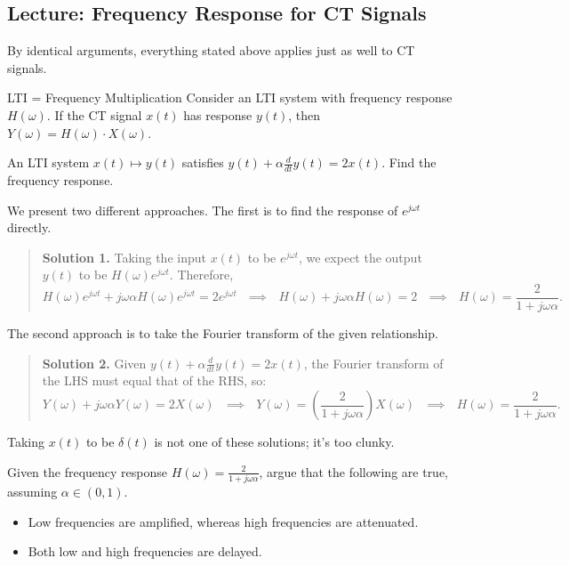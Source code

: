 \subsection{Lecture: Frequency Response for CT Signals}

By identical arguments, everything stated above
applies just as well to CT signals.

\begin{theorem}{LTI = Frequency Multiplication}
    Consider an LTI system with frequency response $H(\omega)$.
    If the CT signal $x(t)$ has response $y(t)$,
    then $Y(\omega) = H(\omega) \cdot X(\omega)$.
\end{theorem}

\begin{problem}
    An LTI system $x(t) \mapsto y(t)$ satisfies
    $y(t) + \alpha \frac{d}{dt} y(t) = 2x(t)$.
    Find the frequency response.
\end{problem}

\begin{solution}
    We present two different approaches.
    The first is to find the response of $e^{j \omega t}$ directly.
    \begin{quote}
        \textbf{Solution 1.}
        Taking the input $x(t)$ to be $e^{j \omega t}$,
        we expect the output $y(t)$ to be $H(\omega) e^{j \omega t}$.
        Therefore,
        \[ H(\omega) e^{j \omega t}
        + j \omega \alpha H(\omega) e^{j \omega t}
        = 2 e^{j \omega t}
        ~~~ \implies ~~~
        H(\omega) + j \omega \alpha H(\omega) = 2
        ~~~ \implies ~~~
        H(\omega) = \frac{2}{1 + j \omega \alpha}. \]
    \end{quote}
    The second approach is to take the Fourier transform of the given relationship.
    \begin{quote}
        \textbf{Solution 2.}
        Given $y(t) + \alpha \frac{d}{dt} y(t) = 2x(t)$,
        the Fourier transform of the LHS must equal that of the RHS, so:
        \[ Y(\omega) + j \omega \alpha Y(\omega) = 2 X(\omega)
        ~~~ \implies ~~~
        Y(\omega) = \left(\frac{2}{1 + j \omega \alpha}\right) X(\omega)
        ~~~ \implies ~~~
        H(\omega) = \frac{2}{1 + j \omega \alpha}. \]
    \end{quote}
    Taking $x(t)$ to be $\delta(t)$ is not one of these solutions;
    it's too clunky.
\end{solution}

\begin{remark}
    Given the frequency response $H(\omega) = \frac{2}{1 + j \omega \alpha}$,
    argue that the following are true, assuming $\alpha \in (0, 1)$.
    \begin{itemize}
        \item Low frequencies are amplified,
        whereas high frequencies are attenuated.
        \item Both low and high frequencies are delayed.
    \end{itemize}
\end{remark}

